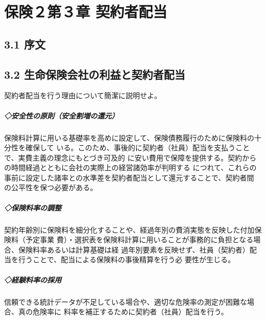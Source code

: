 \documentclass[report,gutter=10mm,fore-edge=10mm,uplatex,dvipdfmx]{jlreq}
\begin{document}
\chapter{保険２第３章 契約者配当}
\section{3.1 序文}
\section{3.2 生命保険会社の利益と契約者配当}
契約者配当を行う理由について簡潔に説明せよ。
\paragraph{◇安全性の原則（安全割増の還元）}
保険料計算に用いる基礎率を高めに設定して、保険債務履行のために保険料の十分性を確保して
いる。このため、事後的に契約者（社員）配当を支払うことで、実費主義の理念にもとづき可及的
に安い費用で保障を提供する。契約からの時間経過とともに会社の実際上の経営諸効率が判明する
につれて、これらの事前に設定した諸率との水準差を契約者配当として還元することで、契約者間
の公平性を保つ必要がある。
\paragraph{◇保険料率の調整}
契約年齢別に保険料を細分化することや、経過年別の費消実態を反映した付加保険料（予定事業
費）・選択表を保険料計算に用いることが事務的に負担となる場合、保険料率あるいは計算基礎は経
過年別要素を反映せず、社員（契約者）配当を行うことで、配当による保険料の事後精算を行う必
要性が生じる。
\paragraph{◇経験料率の採用}
信頼できる統計データが不足している場合や、適切な危険率の測定が困難な場合、真の危険率に
料率を補正するために契約者（社員）配当を行う。
\end{document}
